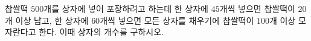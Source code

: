 찹쌀떡 $500$개를 상자에 넣어 포장하려고 하는데 한 상자에 $45$개씩 넣으면 찹쌀떡이 $20$개 이상 남고, 한 상자에 $60$개씩 넣으면 모든 상자를 채우기에 찹쌀떡이 $100$개 이상 모자란다고 한다. 이때 상자의 개수를 구하시오.
